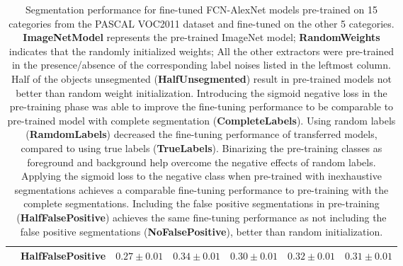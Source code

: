 \begin{table}[t]
{\begin{tabular}{l|l|llll|l}
                                                                                      & HalfFalsePositive                                                  & \multicolumn{1}{l}{$0.27\pm0.01$}                                                                       & \multicolumn{1}{l}{$0.34\pm0.01$}                                                           & \multicolumn{1}{l}{$0.30\pm0.01$}                                                                              & \multicolumn{1}{l|}{$0.32\pm0.01$}                                                                      & $\mathbf{0.31\pm0.01}$                                                                                                 \\ \hline

\end{tabular}
}
\caption{
Segmentation performance for fine-tuned FCN-AlexNet models pre-trained on 15 categories from the PASCAL VOC2011 dataset and fine-tuned on the other 5 categories.
\textbf{ImageNetModel} represents the pre-trained ImageNet model;
\textbf{RandomWeights} indicates that the randomly initialized weights;
All the other extractors were pre-trained in the presence/absence of the corresponding label noises listed in the leftmost column.
Half of the objects unsegmented (\textbf{HalfUnsegmented}) result in pre-trained models not better than random weight initialization.
Introducing the sigmoid negative loss in the pre-training phase was able to improve the fine-tuning performance to be comparable to pre-trained model with complete segmentation (\textbf{CompleteLabels}).
Using random labels (\textbf{RamdomLabels}) decreased the fine-tuning performance of transferred models, compared to using true labels (\textbf{TrueLabels}).
Binarizing the pre-training classes as foreground and background help overcome the negative effects of random labels.
Applying the sigmoid loss to the negative class when pre-trained with inexhaustive segmentations achieves a comparable fine-tuning performance to pre-training with the complete segmentations.
Including the false positive segmentations in pre-training (\textbf{HalfFalsePositive}) achieves the same fine-tuning performance as not including the false positive segmentations (\textbf{NoFalsePositive}), better than random initialization.
}
\label{tab:robustness}
\end{table}



